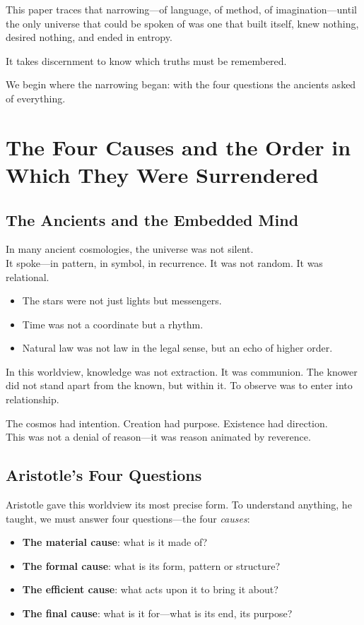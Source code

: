 \documentclass[11pt,a4paper]{article}
\begin{document}
This paper traces that narrowing---of language, of method, of imagination---until the only universe that could be spoken of was one that built itself, knew nothing, desired nothing, and ended in entropy.

It takes discernment to know which truths must be remembered.

We begin where the narrowing began: with the four questions the ancients asked of everything.

\section{The Four Causes and the Order in Which They Were Surrendered}

\subsection{The Ancients and the Embedded Mind}

In many ancient cosmologies, the universe was not silent.\\
It spoke---in pattern, in symbol, in recurrence. It was not random. It was relational.

\begin{itemize}
  \item The stars were not just lights but messengers.
  \item Time was not a coordinate but a rhythm.
  \item Natural law was not law in the legal sense, but an echo of higher order.
\end{itemize}

In this worldview, knowledge was not extraction. It was communion. The knower did not stand apart from the known, but within it. To observe was to enter into relationship.

The cosmos had intention. Creation had purpose. Existence had direction.\\
This was not a denial of reason---it was reason animated by reverence.

\subsection{Aristotle's Four Questions}

Aristotle gave this worldview its most precise form. To understand anything, he taught, we must answer four questions---the four \emph{causes}:

\begin{itemize}
  \item \textbf{The material cause}: what is it made of?
  \item \textbf{The formal cause}: what is its form, pattern or structure?
  \item \textbf{The efficient cause}: what acts upon it to bring it about?
  \item \textbf{The final cause}: what is it for---what is its end, its purpose?
\end{itemize}
\end{document}
